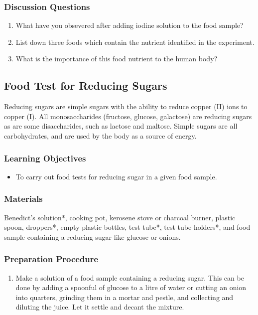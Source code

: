 \subsubsection*{Discussion Questions}
\begin{enumerate}
\item{What have you obsevered after adding iodine solution to the food sample?}
\item{List down three foods which contain the nutrient identified in the experiment.}
\item{What is the importance of this food nutrient to the human body?}
\end{enumerate}

\subsection{Food Test for Reducing Sugars}
 Reducing sugars are simple sugars with the ability to reduce copper (II) ions to copper (I). All monosaccharides (fructose, glucose, galactose) are reducing sugars as are some disaccharides, such as lactose and maltose. Simple sugars are all carbohydrates, and are used by the body as a source of energy.

\subsubsection*{Learning Objectives}
\begin{itemize}
\item{To carry out food tests for reducing sugar in a given food sample.}
\end{itemize}

\subsubsection*{Materials}
Benedict's solution*, cooking pot, kerosene stove or charcoal burner, plastic spoon, droppers*, empty plastic bottles, test tube*, test tube holders*, and food sample containing a reducing sugar like glucose or onions.

\subsubsection*{Preparation Procedure}
\begin{enumerate}
\item{Make a solution of a food sample containing a reducing sugar. This can be done by adding a spoonful of glucose to a litre of water or cutting an onion into quarters, grinding them in a mortar and pestle, and collecting and diluting the juice. Let it settle and decant the mixture.}
\end{enumerate}

